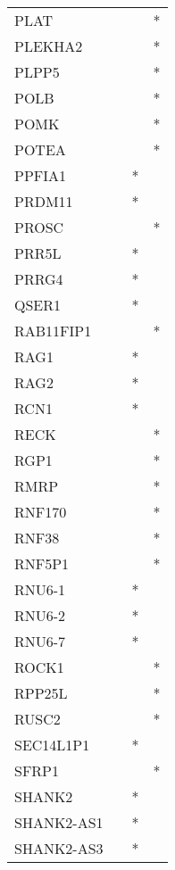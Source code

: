 \begin{longtable}{lccc}
PLAT          &       &    &       * \\
PLEKHA2       &       &    &       * \\
PLPP5         &       &    &       * \\
POLB          &       &    &       * \\
POMK          &       &    &       * \\
POTEA         &       &    &       * \\
PPFIA1        &       &  * &         \\
PRDM11        &       &  * &         \\
PROSC         &       &    &       * \\
PRR5L         &       &  * &         \\
PRRG4         &       &  * &         \\
QSER1         &       &  * &         \\
RAB11FIP1     &       &    &       * \\
RAG1          &       &  * &         \\
RAG2          &       &  * &         \\
RCN1          &       &  * &         \\
RECK          &       &    &       * \\
RGP1          &       &    &       * \\
RMRP          &       &    &       * \\
RNF170        &       &    &       * \\
RNF38         &       &    &       * \\
RNF5P1        &       &    &       * \\
RNU6-1        &       &  * &         \\
RNU6-2        &       &  * &         \\
RNU6-7        &       &  * &         \\
ROCK1         &       &    &       * \\
RPP25L        &       &    &       * \\
RUSC2         &       &    &       * \\
SEC14L1P1     &       &  * &         \\
SFRP1         &       &    &       * \\
SHANK2        &       &  * &         \\
SHANK2-AS1    &       &  * &         \\
SHANK2-AS3    &       &  * &         \\

\end{longtable}
